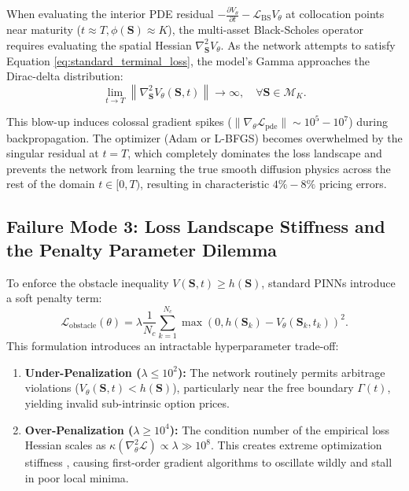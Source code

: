 \documentclass[11pt,a4paper]{article}
\begin{document}
When evaluating the interior PDE residual $-\frac{\partial V_\theta}{\partial t} - \mathcal{L}_{\text{BS}} V_\theta$ at collocation points near maturity ($t \approx T, \phi(\mathbf{S}) \approx K$), the multi-asset Black-Scholes operator requires evaluating the spatial Hessian $\nabla^2_{\mathbf{S}} V_\theta$. As the network attempts to satisfy Equation \eqref{eq:standard_terminal_loss}, the model's Gamma approaches the Dirac-delta distribution:
\begin{equation}
\label{eq:gamma_blowup}
\lim_{t \to T} \left\| \nabla^2_{\mathbf{S}} V_\theta(\mathbf{S}, t) \right\| \to \infty, \quad \forall \mathbf{S} \in \mathcal{M}_K.
\end{equation}

This blow-up induces colossal gradient spikes ($\|\nabla_\theta \mathcal{L}_{\text{pde}}\| \sim 10^5 - 10^7$) during backpropagation. The optimizer (Adam or L-BFGS) becomes overwhelmed by the singular residual at $t=T$, which completely dominates the loss landscape and prevents the network from learning the true smooth diffusion physics across the rest of the domain $t \in [0, T)$, resulting in characteristic $4\% - 8\%$ pricing errors.

\subsection{Failure Mode 3: Loss Landscape Stiffness and the Penalty Parameter Dilemma}
To enforce the obstacle inequality $V(\mathbf{S}, t) \ge h(\mathbf{S})$, standard PINNs introduce a soft penalty term:
\begin{equation}
\label{eq:soft_penalty_analysis}
\mathcal{L}_{\text{obstacle}}(\theta) = \lambda \frac{1}{N_c} \sum_{k=1}^{N_c} \max\left(0, h(\mathbf{S}_k) - V_\theta(\mathbf{S}_k, t_k)\right)^2.
\end{equation}
This formulation introduces an intractable hyperparameter trade-off:
\begin{enumerate}[label=(\alph*)]
    \item \textbf{Under-Penalization ($\lambda \le 10^2$):} The network routinely permits arbitrage violations ($V_\theta(\mathbf{S}, t) < h(\mathbf{S})$), particularly near the free boundary $\Gamma(t)$, yielding invalid sub-intrinsic option prices.
    \item \textbf{Over-Penalization ($\lambda \ge 10^4$):} The condition number of the empirical loss Hessian scales as $\kappa\left(\nabla^2_\theta \mathcal{L}\right) \propto \lambda \gg 10^8$. This creates extreme optimization stiffness \cite{wang2021understanding, krishnapriyan2021characterizing}, causing first-order gradient algorithms to oscillate wildly and stall in poor local minima.
\end{enumerate}
\end{document}
